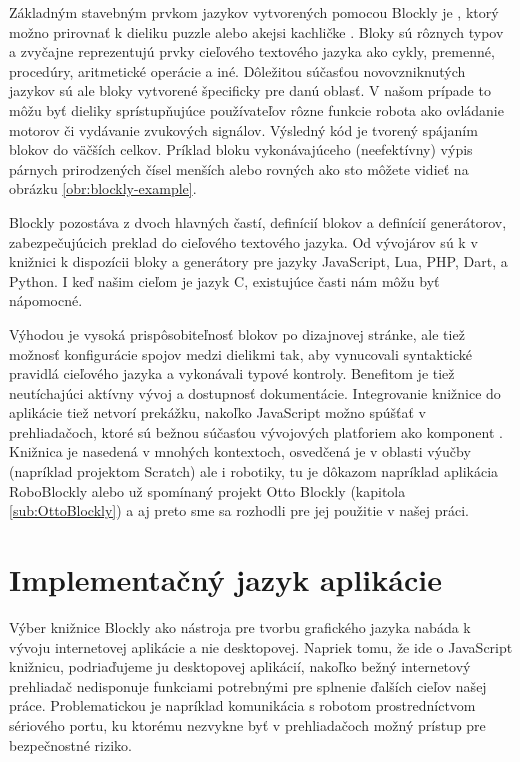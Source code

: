 Základným stavebným prvkom jazykov vytvorených pomocou Blockly je , ktorý možno prirovnať k dieliku puzzle alebo akejsi kachličke \cite{pasternak2017tips}. Bloky sú rôznych typov a zvyčajne reprezentujú prvky cieľového textového jazyka ako cykly, premenné, procedúry, aritmetické operácie a iné. Dôležitou súčasťou novovzniknutých jazykov sú ale bloky vytvorené špecificky pre danú oblasť. V našom prípade to môžu byť dieliky sprístupňujúce používateľov rôzne funkcie robota ako ovládanie motorov či vydávanie zvukových signálov. Výsledný kód je tvorený spájaním blokov do väčších celkov. Príklad bloku vykonávajúceho (neefektívny) výpis párnych prirodzených čísel menších alebo rovných ako sto môžete vidieť na obrázku \ref{obr:blockly-example}.

Blockly pozostáva z dvoch hlavných častí, definícií blokov a definícií generátorov, zabezpečujúcich preklad do cieľového textového jazyka. Od vývojárov sú k v knižnici k dispozícii  bloky a generátory pre jazyky JavaScript, Lua, PHP, Dart, a Python. I keď našim cieľom je jazyk C, existujúce časti nám môžu byť nápomocné.

Výhodou je vysoká prispôsobiteľnosť blokov po dizajnovej stránke, ale tiež možnosť konfigurácie spojov medzi dielikmi tak, aby vynucovali syntaktické pravidlá cieľového jazyka a vykonávali typové kontroly. Benefitom je tiež neutíchajúci aktívny vývoj a dostupnosť dokumentácie. Integrovanie knižnice do aplikácie tiež netvorí prekážku, nakoľko JavaScript možno spúšťať v prehliadačoch, ktoré sú bežnou súčasťou vývojových platforiem ako komponent . Knižnica je nasedená v mnohých kontextoch, osvedčená je v oblasti výučby (napríklad projektom Scratch) ale i robotiky, tu je dôkazom napríklad aplikácia RoboBlockly alebo už spomínaný projekt Otto Blockly (kapitola \ref{sub:OttoBlockly}) a aj preto sme sa rozhodli pre jej použitie v našej práci.


\section{Implementačný jazyk aplikácie}
Výber knižnice Blockly ako nástroja pre tvorbu grafického jazyka nabáda k vývoju internetovej aplikácie a nie desktopovej. Napriek tomu, že ide o JavaScript knižnicu, podriaďujeme ju desktopovej aplikácií, nakoľko bežný internetový prehliadač nedisponuje funkciami potrebnými pre splnenie ďalších cieľov našej práce. Problematickou je napríklad komunikácia s robotom prostredníctvom sériového portu, ku ktorému nezvykne byť v prehliadačoch možný prístup pre bezpečnostné riziko. 


